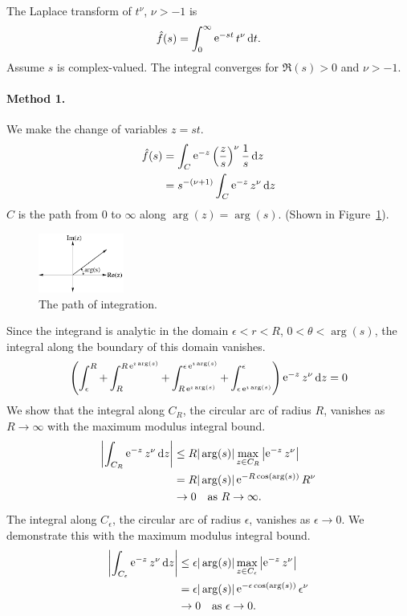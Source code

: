 {%
\begin{Solution}
  \label{solution L(t nu)}
  The Laplace transform of $t^\nu$, $\nu > -1$ is
  \[ 
  \hat{f}(s) = \int_0^\infty \mathop{\mathrm{e}}\nolimits^{-s t} t^\nu \,\mathrm{d} t. 
  \]
  Assume $s$ is complex-valued. The integral converges for
  $\Re(s) > 0$ and $\nu > -1$.

  \paragraph{Method 1.}
  We make the change of variables $z = s t$.
  \begin{align*}
    \hat{f}(s)    
    &= \int_C \mathop{\mathrm{e}}\nolimits^{-z} \left(\frac{z}{s}\right)^\nu \frac{1}{s} \,\mathrm{d} z \\
    &= s^{-(\nu+1)} \int_C \mathop{\mathrm{e}}\nolimits^{-z} z^{\nu}\,\mathrm{d} z
  \end{align*}
  $C$ is the path from $0$ to $\infty$ along $\arg(z) = \arg(s)$.
  (Shown in Figure~\ref{Cpath}).

  \begin{figure}[h!]
    \begin{center}
      \includegraphics[width=0.25\textwidth]{ode/laplace/cpath}
    \end{center}
    \caption{The path of integration.}
    \label{Cpath}
  \end{figure}



  Since the integrand is analytic in the domain $\epsilon < r < R$, $0 < \theta < \arg(s)$,
  the integral along the boundary of this domain vanishes.
  \[ 
  \left( \int_\epsilon^R + \int_R^{R \mathop{\mathrm{e}}\nolimits^{\imath \arg(s)}} + \int_{R \mathop{\mathrm{e}}\nolimits^{\imath \arg(s)}}^{\epsilon \mathop{\mathrm{e}}\nolimits^{\imath \arg(s)}} 
    + \int_{\epsilon \mathop{\mathrm{e}}\nolimits^{\imath \arg(s)}}^\epsilon \right) \mathop{\mathrm{e}}\nolimits^{-z} z^\nu \, \mathrm{d} z = 0 
  \]
  We show that the integral along $C_R$, the circular arc of radius $R$, 
  vanishes as $R \to \infty$ with the maximum modulus integral bound.
  \begin{align*}
    \left| \int_{C_R} \mathop{\mathrm{e}}\nolimits^{-z} z^\nu \,\mathrm{d} z \right|
    &\leq R | \arg(s) | \max_{z \in C_R} \left| \mathop{\mathrm{e}}\nolimits^{-z} z^\nu \right| \\
    &= R |\arg(s)| \mathop{\mathrm{e}}\nolimits^{-R \cos(\arg(s))} R^\nu \\
    &\to 0 \quad \mathrm{as}\ R \to \infty.
  \end{align*}
  The integral along $C_\epsilon$, the circular arc of radius $\epsilon$, 
  vanishes as $\epsilon \to 0$.  We demonstrate this with the maximum modulus 
  integral bound.
  \begin{align*}
    \left| \int_{C_\epsilon} \mathop{\mathrm{e}}\nolimits^{-z} z^\nu \,\mathrm{d} z \right|
    &\leq \epsilon | \arg(s) | \max_{z \in C_\epsilon} \left| \mathop{\mathrm{e}}\nolimits^{-z} z^\nu \right| \\
    &= \epsilon |\arg(s)| \mathop{\mathrm{e}}\nolimits^{-\epsilon \cos(\arg(s))} \epsilon^\nu \\
    &\to 0 \quad \mathrm{as}\ \epsilon \to 0.
  \end{align*}



\end{Solution}}
